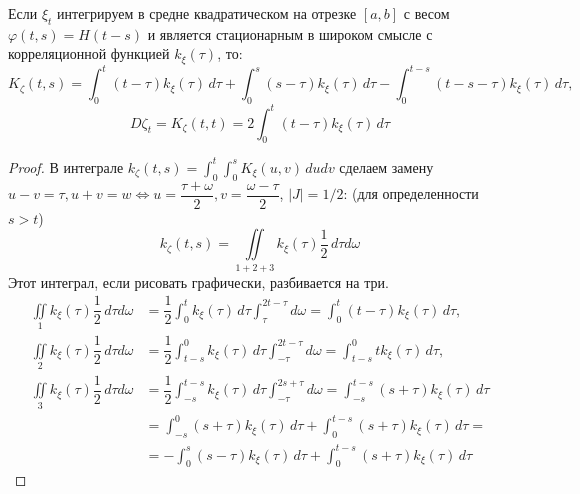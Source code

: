 \begin{theorem}
  Если $\xi_t$ интегрируем в средне квадратическом на отрезке $[a, b]$ с весом $\varphi(t, s) = H(t-s)$ и является стационарным в широком смысле с корреляционной функцией $k_\xi(\tau)$,
  то:
  \[
    K_\zeta(t, s) = \int_0^t (t-\tau) k_\xi(\tau) \, d\tau + \int_0^s (s-\tau) k_\xi(\tau) \, d\tau
    - \int_0^{t-s} (t-s-\tau) k_\xi(\tau) \, d\tau,
  \]
  \[
    D\zeta_t = K_\zeta (t, t) = 2 \int_0^t (t-\tau) k_\xi(\tau) \, d\tau
  \]
\end{theorem}
\begin{proof}
  В интеграле $k_\zeta(t, s) = \int_0^t \int_0^s K_\xi(u, v) \, du dv$
  сделаем замену $u-v = \tau, u+v = w \Leftrightarrow
  u = \dfrac{\tau+\omega}{2}, v = \dfrac{\omega-\tau}{2}$, $|J| = 1/2$:
  (для определенности $s>t$)
  \[
    k_\zeta(t, s) = \iint\limits_{1+2+3} k_\xi(\tau) \dfrac{1}{2} \, d\tau d\omega
  \]
  Этот интеграл, если рисовать графически, разбивается на три.
  \begin{align*}
    \iint\limits_1 k_\xi(\tau) \dfrac{1}{2} \, d\tau d\omega &=
    \dfrac{1}{2} \int_0^t k_\xi(\tau) \, d\tau \int_\tau^{2t-\tau} d\omega = \int_0^t (t-\tau) k_\xi(\tau) \, d\tau, \\
    \iint\limits_2 k_\xi(\tau) \dfrac{1}{2} \, d\tau d\omega &=
    \dfrac{1}{2} \int_{t-s}^0 k_\xi(\tau) \, d\tau \int_{-\tau}^{2t-\tau} d\omega = \int_{t-s}^0 t k_\xi(\tau) \, d\tau, \\
    \iint\limits_3 k_\xi(\tau) \dfrac{1}{2} \, d\tau d\omega &=
    \dfrac{1}{2} \int_{-s}^{t-s} k_\xi(\tau) \, d\tau \int_{-\tau}^{2s+\tau} d\omega
    = \int_{-s}^{t-s} (s+\tau) k_\xi(\tau) \, d\tau \\
    &= \int_{-s}^0 (s+\tau) k_\xi(\tau) \, d\tau + \int_0^{t-s} (s+\tau) k_\xi(\tau) \, d\tau = \\
    &= - \int_{0}^s (s-\tau) k_\xi(\tau) \, d\tau + \int_0^{t-s} (s+\tau) k_\xi(\tau) \, d\tau
  \end{align*}
\end{proof}

